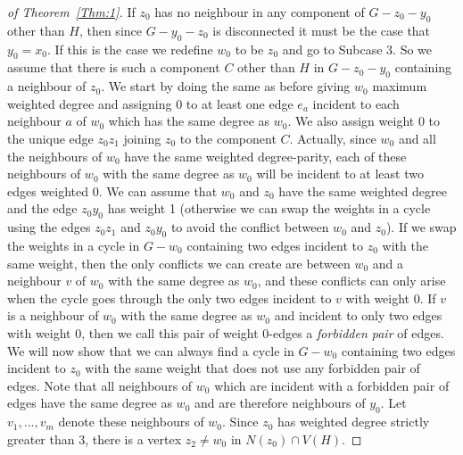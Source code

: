 \documentclass[
final,
 nomarks,
]{dmtcs-episciences}
\theoremstyle{definition}
\begin{document}
\begin{proof}[of Theorem~\ref{Thm:1}]
If $z_0$ has no neighbour in any component of $G-z_0-y_0$ other than $H$, then since $G-y_0-z_0$ is disconnected it must be the case that $y_0=x_0$. If this is the case we redefine $w_0$ to be $z_0$ and go to Subcase 3.  So we assume that there is such a component $C$ other than $H$ in $G-z_0-y_0$ containing a neighbour of $z_0$. We start by doing the same as before giving $w_0$ maximum weighted degree and assigning 0 to at least one edge $e_a$ incident to each neighbour $a$ of $w_0$ which has the same degree as $w_0$. We also assign weight 0 to the unique edge $z_0z_1$ joining  $z_0$ to the component $C$. Actually, since $w_0$ and all the neighbours of $w_0$ have the same weighted degree-parity, each of these neighbours of $w_0$ with the same degree as $w_0$ will be incident to at least two edges weighted 0. We can assume that $w_0$ and $z_0$ have the same weighted degree and the edge $z_0y_0$ has weight 1 (otherwise we can swap the weights in a cycle using the edges $z_0z_1$ and $z_0y_0$ to avoid the conflict between $w_0$ and $z_0$). If we swap the weights in a cycle in $G-w_0$ containing two edges incident to $z_0$ with the same weight, then the only conflicts we can create are between $w_0$ and a neighbour $v$ of $w_0$ with the same degree as $w_0$, and these conflicts can only arise when the cycle goes through the only two edges incident to $v$ with weight 0. If $v$ is a neighbour of $w_0$ with the same degree as $w_0$ and incident to only two edges with weight 0, then we call this pair of weight 0-edges a \textit{forbidden pair} of edges. \\ 
We will now show that we can always find a cycle in $G-w_0$ containing two edges incident to $z_0$ with the same weight that does not use any forbidden pair of edges. Note that all neighbours of $w_0$ which are incident with a forbidden pair of edges have the same degree as $w_0$ and are therefore neighbours of $y_0$. Let $v_1,...,v_m$ denote these neighbours of $w_0$. Since $z_0$ has weighted degree strictly greater than 3, there is a vertex $z_2 \neq w_0$ in $N(z_0) \cap V(H)$.

\end{proof}
\end{document}
